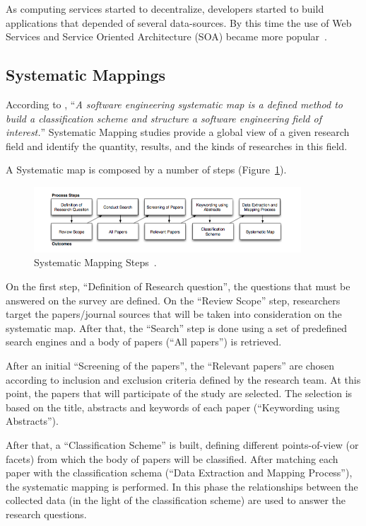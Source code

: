 \documentclass{article}
\begin{document}
As computing services started to decentralize, developers started to build applications that depended of several data-sources. 
By this time the use of Web Services and Service Oriented Architecture (SOA) became more popular~\cite{Armbrust09m.:above}. 


\subsection{Systematic Mappings}
According to \cite{Petersen:2008:SMS:2227115.2227123}, ``\textit{A software engineering systematic map is a defined method to build a classification scheme and structure a software engineering field of interest.}''
Systematic Mapping studies provide a global view of a given research field and identify the quantity, results, and the kinds of researches in this field.

A Systematic map is composed by a number of steps (Figure~\ref{fig:sms}).
\begin{figure}[ht!]
\centering
\includegraphics[width=100mm]{pic1.png}
\caption{Systematic Mapping Steps~\cite{Petersen:2008:SMS:2227115.2227123}.\label{fig:sms}}
\end{figure}

On the first step, ``Definition of Research question'', the questions that must be answered on the survey are defined. 
On the ``Review Scope'' step, researchers target the papers/journal sources that will be taken into consideration on the systematic map. 
After that, the ``Search'' step is done using a set of predefined search engines and a body of papers (``All papers'') is retrieved. 

After an initial ``Screening of the papers'', the ``Relevant papers'' are chosen according to inclusion and exclusion criteria defined by the research team. 
At this point, the papers that will participate of the study are selected. 
The selection is based on the title, abstracts and keywords of each paper (``Keywording using Abstracts'').

After that, a ``Classification Scheme'' is built, defining different points-of-view (or facets) from which the body of papers will be classified. 
After matching each paper with the classification schema (``Data Extraction and Mapping Process''), the  systematic mapping is performed.
In this phase the relationships between the collected data (in the light of the classification scheme) are used to answer the research questions.
\end{document}
